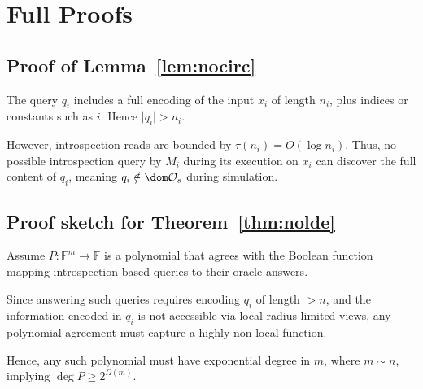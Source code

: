 \documentclass[12pt]{article}
\newcommand{\OO}{\mathcal{O}}
\newcommand{\F}{\mathbb{F}}
\theoremstyle{definition}
\theoremstyle{plain}
\begin{document}
\appendix
\section{Full Proofs}
\label{appendix:proofs}

\subsection{Proof of Lemma~\ref{lem:nocirc}}
The query \(q_i\) includes a full encoding of the input \(x_i\) of length \(n_i\), plus indices or constants such as \(i\). Hence \(\lvert q_i\rvert > n_i\).

However, introspection reads are bounded by \(\tau(n_i) = O(\log n_i)\). Thus, no possible introspection query by \(M_i\) during its execution on \(x_i\) can discover the full content of \(q_i\), meaning \(q_i\notin\dom\OO_s\) during simulation.

\subsection{Proof sketch for Theorem~\ref{thm:nolde}}
Assume \(P:\F^m\to\F\) is a polynomial that agrees with the Boolean function mapping introspection-based queries to their oracle answers.

Since answering such queries requires encoding \(q_i\) of length \(>n\), and the information encoded in \(q_i\) is not accessible via local radius-limited views, any polynomial agreement must capture a highly non-local function.

Hence, any such polynomial must have exponential degree in \(m\), where \(m\sim n\), implying \(\deg P \ge 2^{\Omega(m)}\).



\end{document}
